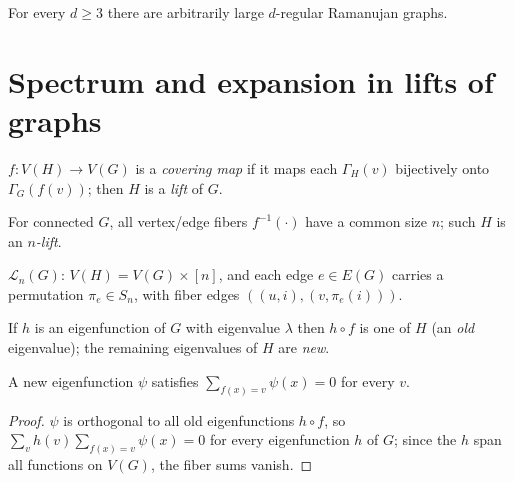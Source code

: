 \begin{theorem}
  \label{conj:ramanujan-every-degree}
  \notready
  For every $d\ge3$ there are arbitrarily large $d$-regular Ramanujan graphs.
\end{theorem}


\chapter{Spectrum and expansion in lifts of graphs}

\begin{definition}
  \label{def:covering-map}
  $f:V(H)\to V(G)$ is a \emph{covering map} if it maps each $\Gamma_H(v)$
  bijectively onto $\Gamma_G(f(v))$; then $H$ is a \emph{lift} of $G$.
\end{definition}

\begin{definition}
  \label{def:fiber}
  For connected $G$, all vertex/edge fibers $f^{-1}(\cdot)$ have a common size
  $n$; such $H$ is an \emph{$n$-lift}.
\end{definition}

\begin{definition}
  \label{def:n-lift}
  $\mathcal L_n(G)$: $V(H)=V(G)\times[n]$, and each edge $e\in E(G)$ carries a
  permutation $\pi_e\in S_n$, with fiber edges $((u,i),(v,\pi_e(i)))$.
\end{definition}

\begin{definition}
  \label{def:old-new}
  If $h$ is an eigenfunction of $G$ with eigenvalue $\lambda$ then $h\circ f$ is
  one of $H$ (an \emph{old} eigenvalue); the remaining eigenvalues of $H$ are
  \emph{new}.
\end{definition}

\begin{proposition}
  \label{prop:new-eigenfunction-zero}
  A new eigenfunction $\psi$ satisfies $\sum_{f(x)=v}\psi(x)=0$ for every $v$.
\end{proposition}
\begin{proof}
  $\psi$ is orthogonal to all old eigenfunctions $h\circ f$, so
  $\sum_vh(v)\sum_{f(x)=v}\psi(x)=0$ for every eigenfunction $h$ of $G$; since
  the $h$ span all functions on $V(G)$, the fiber sums vanish.
\end{proof}

